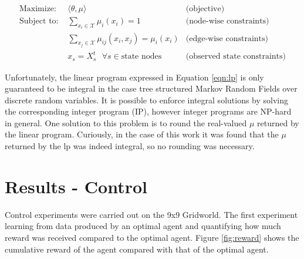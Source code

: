 \documentclass{article} %
\begin{document}
\begin{equation}
\begin{array}{llr}
\textrm{Maximize: } & \langle \theta, \mu \rangle & \textrm{(objective)}\\
\textrm{Subject to: } & \sum_{x_i \in \mathcal{X}} \mu_i(x_i) = 1 & \textrm{(node-wise constraints)}\\
& \sum_{x_j \in \mathcal{X}} \mu_{ij}(x_i,x_j) = \mu_i(x_i) & \textrm{(edge-wise constraints)}\\
& x_s = X_s^t \textrm{ } \forall s \in \textrm{state nodes} & \textrm{(observed state constraints)}
\end{array}
\label{eqn:lp}
\end{equation}

Unfortunately, the linear program expressed in Equation \ref{eqn:lp} is only guaranteed to be integral in the case tree structured Markov Random Fields over discrete random variables. It is possible to enforce integral solutions by solving the corresponding integer program (IP), however integer programs are NP-hard in general. One solution to this problem is to round the real-valued $\mu$ returned by the linear program. Curiously, in the case of this work it was found that the $\mu$ returned by the lp was indeed integral, so no rounding was necessary.


\section{Results - Control}
Control experiments were carried out on the 9x9 Gridworld. The first experiment  learning from data produced by an optimal agent and quantifying how much reward was received compared to the optimal agent. Figure \ref{fig:reward} shows the cumulative reward of the agent compared with that of the optimal agent.
\end{document}
